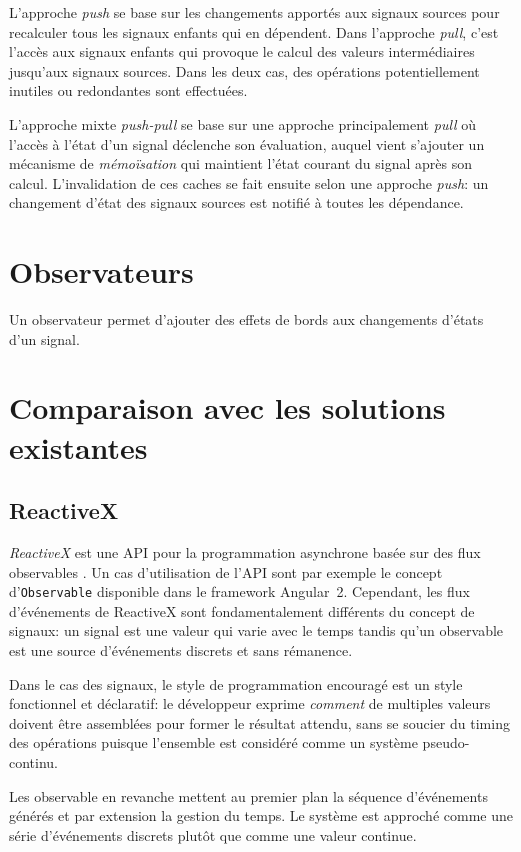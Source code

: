 	L'approche \emph{push} se base sur les changements apportés aux signaux sources pour recalculer tous les signaux enfants qui en dépendent. Dans l'approche \emph{pull}, c'est l'accès aux signaux enfants qui provoque le calcul des valeurs intermédiaires jusqu'aux signaux sources. Dans les deux cas, des opérations potentiellement inutiles ou redondantes sont effectuées.
	
	L'approche mixte \emph{push-pull} se base sur une approche principalement \emph{pull} où l'accès à l'état d'un signal déclenche son évaluation, auquel vient s'ajouter un mécanisme de \emph{mémoïsation} qui maintient l'état courant du signal après son calcul. L'invalidation de ces caches se fait ensuite selon une approche \emph{push}: un changement d'état des signaux sources est notifié à toutes les dépendance.

\section{Observateurs} \label{sec:sig-obs}

	Un observateur permet d'ajouter des effets de bords aux changements d'états d'un signal.

\section{Comparaison avec les solutions existantes}

	\subsection{ReactiveX}
	
	\emph{ReactiveX} est une \og API pour la programmation asynchrone basée sur des flux observables \fg. Un cas d'utilisation de l'API sont par exemple le concept d'\texttt{Observable} disponible dans le framework Angular~2. Cependant, les flux d'événements de ReactiveX sont fondamentalement différents du concept de signaux: un signal est une valeur qui varie avec le temps tandis qu'un observable est une source d'événements discrets et sans rémanence.
	
	Dans le cas des signaux, le style de programmation encouragé est un style fonctionnel et déclaratif: le développeur exprime \emph{comment} de multiples valeurs doivent être assemblées pour former le résultat attendu, sans se soucier du timing des opérations puisque l'ensemble est considéré comme un système pseudo-continu.
	
	Les observable en revanche mettent au premier plan la séquence d'événements générés et par extension la gestion du temps. Le système est approché comme une série d'événements discrets plutôt que comme une valeur continue.
	
